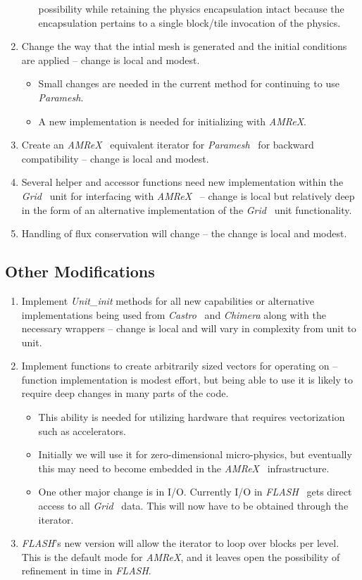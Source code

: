 \documentclass{article}
\newcommand{\flash}{{\it FLASH}}
\newcommand{\amrex}{{\it AMReX}}
\newcommand{\paramesh}{{\it Paramesh}}
\newcommand{\castro}{{\it Castro}\xspace}
\newcommand{\chimera}{{\it Chimera}\xspace}
\newcommand{\grid}{{\it Grid}}
\begin{document}
\begin{enumerate}
\begin{itemize}
possibility while retaining the physics encapsulation intact because
the encapsulation pertains to a single block/tile invocation of the physics.
\end{itemize}
\item Change the way that the intial mesh is generated and the initial
conditions are applied -- change is local and modest.
\begin{itemize}
\item Small changes are needed in the current method for continuing
to use \paramesh.
\item A new implementation is needed for initializing with \amrex.
\end{itemize}
\item Create an \amrex~ equivalent iterator for \paramesh~ for backward
compatibility -- change is local and modest.
\item Several helper and accessor functions need new implementation within the
\grid~ unit for interfacing with \amrex~ -- change is local but
relatively deep in the form of an alternative implementation of the
\grid~ unit functionality.
\item Handling of flux conservation will change -- the change is local
and modest.
\end{enumerate}

\subsection{Other Modifications}
\label{sec:other}
\begin{enumerate}
\item Implement {\it Unit\_init} methods for all new capabilities or
alternative implementations being used from \castro~ and \chimera along
with the necessary wrappers -- change is local and will vary in
complexity from unit to unit.
\item Implement functions to create arbitrarily sized vectors for
operating on -- function implementation is modest effort, but being
able to use it is likely to require deep changes in many parts of the
code.
\begin{itemize}
\item This ability is needed for utilizing hardware that requires
vectorization such as accelerators.
\item Initially we will use it for zero-dimensional micro-physics, but
eventually this may need to become embedded in the \amrex~
infrastructure.
\item One other major change is in I/O. Currently I/O in \flash~ gets
direct access to all \grid~ data. This will now have to be obtained
through the iterator.
\end{itemize}
\item \flash's new version will allow the iterator to loop over blocks
per level. This is the default mode for \amrex, and it leaves open the
possibility of refinement in time in \flash.
\end{enumerate}
\end{document}
